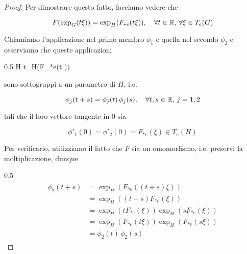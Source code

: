 \begin{proof}
	Per dimostrare questo fatto, facciamo vedere che
	
	\begin{equation}
		F(\exp_{G}(t \xi)) = \exp_{H}(F_{*e}(t \xi)) \qcomma \forall t \in \R, \, \forall \xi \in T_{e}(G)
	\end{equation}

	Chiamiamo l'applicazione nel primo membro $ \phi_{1} $ e quella nel secondo $ \phi_{2} $ e osserviamo che queste applicazioni
	
		{0.5}{%
					{\R}{H}
					{t}{\exp_{H}(F_{*e}(t \xi))}
				}
	
	sono sottogruppi a un parametro di $ H $, i.e.
	
	\begin{equation}
		\phi_{j}(t+s) = \phi_{j}(t) \, \phi_{j}(s) \qcomma \forall t,s \in \R, \, j = 1,2
	\end{equation}
	
	tali che il loro vettore tangente in $ 0 $ sia
	
	\begin{equation}
		\phi'_{1}(0) = \phi'_{2}(0) = F_{*e}(\xi) \in T_{e}(H)
	\end{equation}

	Per verificarlo, utilizziamo il fatto che $ F $ sia un omomorfismo, i.e. preservi la moltiplicazione, dunque
	
		{0.5}{%
				\begin{align}
					\begin{split}
						\phi_{2}(t+s) &= \exp_{H}(F_{*e}((t+s) \xi)) \\
						&= \exp_{H}((t+s) F_{*e}(\xi)) \\
						&= \exp_{H}(t F_{*e}(\xi)) \exp_{H}(s F_{*e}(\xi)) \\
						&= \exp_{H}(F_{*e}(t \xi)) \exp_{H}(F_{*e}(s \xi)) \\
						&= \phi_{2}(t) \, \phi_{2}(s)
					\end{split}
				\end{align}
				}
	

\end{proof}
